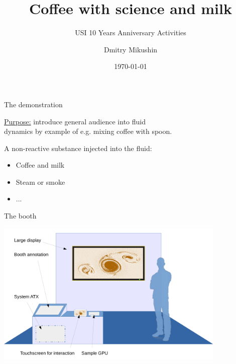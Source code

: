 \documentclass[aspectratio=169]{beamer}
\title[Coffee with science and milk -- USI 10 Years Anniversary Activities]{Coffee with science and milk}
\subtitle{USI 10 Years Anniversary Activities}
\author{Dmitry Mikushin}
\institute{}
\date{\today}
\begin{document}
\begin{frame}
\titlepage
\end{frame}



\begin{frame}[fragile]{The demonstration}

\underline{Purpose:} introduce general audience into fluid\\ dynamics by example of e.g. mixing coffee with spoon.

\vskip10pt

A non-reactive substance injected into the fluid:

\begin{itemize}
\item Coffee and milk
\item Steam or smoke
\item ...
\end{itemize}


\end{frame}



\begin{frame}[fragile]{The booth}

\begin{center}
\includegraphics[width=11cm]{figures/booth}
\end{center}

\end{frame}
\end{document}
